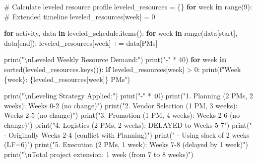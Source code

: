 \documentclass[
  letterpaper,
  DIV=11,
  numbers=noendperiod]{scrreprt}
\newenvironment{Shaded}{\begin{snugshade}}{\end{snugshade}}
\newcommand{\BuiltInTok}[1]{\textcolor[rgb]{0.00,0.23,0.31}{#1}}
\newcommand{\CharTok}[1]{\textcolor[rgb]{0.13,0.47,0.30}{#1}}
\newcommand{\CommentTok}[1]{\textcolor[rgb]{0.37,0.37,0.37}{#1}}
\newcommand{\ControlFlowTok}[1]{\textcolor[rgb]{0.00,0.23,0.31}{\textbf{#1}}}
\newcommand{\DecValTok}[1]{\textcolor[rgb]{0.68,0.00,0.00}{#1}}
\newcommand{\KeywordTok}[1]{\textcolor[rgb]{0.00,0.23,0.31}{\textbf{#1}}}
\newcommand{\NormalTok}[1]{\textcolor[rgb]{0.00,0.23,0.31}{#1}}
\newcommand{\OperatorTok}[1]{\textcolor[rgb]{0.37,0.37,0.37}{#1}}
\newcommand{\SpecialCharTok}[1]{\textcolor[rgb]{0.37,0.37,0.37}{#1}}
\newcommand{\SpecialStringTok}[1]{\textcolor[rgb]{0.13,0.47,0.30}{#1}}
\newcommand{\StringTok}[1]{\textcolor[rgb]{0.13,0.47,0.30}{#1}}
\begin{document}
\begin{Shaded}
\begin{Highlighting}[]
    \CommentTok{\# Calculate leveled resource profile}
\NormalTok{    leveled\_resources }\OperatorTok{=}\NormalTok{ \{\}}
    \ControlFlowTok{for}\NormalTok{ week }\KeywordTok{in} \BuiltInTok{range}\NormalTok{(}\DecValTok{9}\NormalTok{):  }\CommentTok{\# Extended timeline}
\NormalTok{        leveled\_resources[week] }\OperatorTok{=} \DecValTok{0}
    
    \ControlFlowTok{for}\NormalTok{ activity, data }\KeywordTok{in}\NormalTok{ leveled\_schedule.items():}
        \ControlFlowTok{for}\NormalTok{ week }\KeywordTok{in} \BuiltInTok{range}\NormalTok{(data[}\StringTok{\textquotesingle{}start\textquotesingle{}}\NormalTok{], data[}\StringTok{\textquotesingle{}end\textquotesingle{}}\NormalTok{]):}
\NormalTok{            leveled\_resources[week] }\OperatorTok{+=}\NormalTok{ data[}\StringTok{\textquotesingle{}PMs\textquotesingle{}}\NormalTok{]}
    
    \BuiltInTok{print}\NormalTok{(}\StringTok{"}\CharTok{\textbackslash{}n}\StringTok{Leveled Weekly Resource Demand:"}\NormalTok{)}
    \BuiltInTok{print}\NormalTok{(}\StringTok{"{-}"} \OperatorTok{*} \DecValTok{40}\NormalTok{)}
    \ControlFlowTok{for}\NormalTok{ week }\KeywordTok{in} \BuiltInTok{sorted}\NormalTok{(leveled\_resources.keys()):}
        \ControlFlowTok{if}\NormalTok{ leveled\_resources[week] }\OperatorTok{\textgreater{}} \DecValTok{0}\NormalTok{:}
            \BuiltInTok{print}\NormalTok{(}\SpecialStringTok{f"Week }\SpecialCharTok{\{}\NormalTok{week}\SpecialCharTok{\}}\SpecialStringTok{: }\SpecialCharTok{\{}\NormalTok{leveled\_resources[week]}\SpecialCharTok{\}}\SpecialStringTok{ PMs"}\NormalTok{)}
    
    \BuiltInTok{print}\NormalTok{(}\StringTok{"}\CharTok{\textbackslash{}n}\StringTok{Leveling Strategy Applied:"}\NormalTok{)}
    \BuiltInTok{print}\NormalTok{(}\StringTok{"{-}"} \OperatorTok{*} \DecValTok{40}\NormalTok{)}
    \BuiltInTok{print}\NormalTok{(}\StringTok{"1. \textquotesingle{}Planning\textquotesingle{} (2 PMs, 2 weeks): Weeks 0{-}2 (no change)"}\NormalTok{)}
    \BuiltInTok{print}\NormalTok{(}\StringTok{"2. \textquotesingle{}Vendor Selection\textquotesingle{} (1 PM, 3 weeks): Weeks 2{-}5 (no change)"}\NormalTok{)}
    \BuiltInTok{print}\NormalTok{(}\StringTok{"3. \textquotesingle{}Promotion\textquotesingle{} (1 PM, 4 weeks): Weeks 2{-}6 (no change)"}\NormalTok{)}
    \BuiltInTok{print}\NormalTok{(}\StringTok{"4. \textquotesingle{}Logistics\textquotesingle{} (2 PMs, 2 weeks): DELAYED to Weeks 5{-}7"}\NormalTok{)}
    \BuiltInTok{print}\NormalTok{(}\StringTok{"   {-} Originally Weeks 2{-}4 (conflict with Planning)"}\NormalTok{)}
    \BuiltInTok{print}\NormalTok{(}\StringTok{"   {-} Using slack of 2 weeks (LF=6)"}\NormalTok{)}
    \BuiltInTok{print}\NormalTok{(}\StringTok{"5. \textquotesingle{}Execution\textquotesingle{} (2 PMs, 1 week): Weeks 7{-}8 (delayed by 1 week)"}\NormalTok{)}
    \BuiltInTok{print}\NormalTok{(}\StringTok{"}\CharTok{\textbackslash{}n}\StringTok{Total project extension: 1 week (from 7 to 8 weeks)"}\NormalTok{)}
    

\end{Highlighting}
\end{Shaded}
\end{document}
